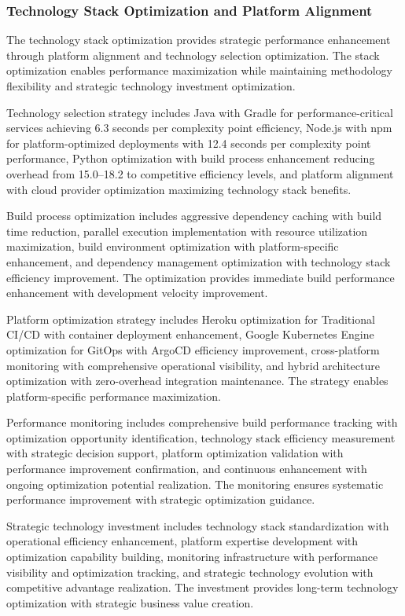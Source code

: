 \subsubsection{Technology Stack Optimization and Platform Alignment}

The technology stack optimization provides strategic performance enhancement through platform alignment and technology selection optimization. The stack optimization enables performance maximization while maintaining methodology flexibility and strategic technology investment optimization.

Technology selection strategy includes Java with Gradle for performance-critical services achieving 6.3 seconds per complexity point efficiency, Node.js with npm for platform-optimized deployments with 12.4 seconds per complexity point performance, Python optimization with build process enhancement reducing overhead from 15.0--18.2 to competitive efficiency levels, and platform alignment with cloud provider optimization maximizing technology stack benefits.

Build process optimization includes aggressive dependency caching with build time reduction, parallel execution implementation with resource utilization maximization, build environment optimization with platform-specific enhancement, and dependency management optimization with technology stack efficiency improvement. The optimization provides immediate build performance enhancement with development velocity improvement.

Platform optimization strategy includes Heroku optimization for Traditional CI/CD with container deployment enhancement, Google Kubernetes Engine optimization for GitOps with ArgoCD efficiency improvement, cross-platform monitoring with comprehensive operational visibility, and hybrid architecture optimization with zero-overhead integration maintenance. The strategy enables platform-specific performance maximization.

Performance monitoring includes comprehensive build performance tracking with optimization opportunity identification, technology stack efficiency measurement with strategic decision support, platform optimization validation with performance improvement confirmation, and continuous enhancement with ongoing optimization potential realization. The monitoring ensures systematic performance improvement with strategic optimization guidance.

Strategic technology investment includes technology stack standardization with operational efficiency enhancement, platform expertise development with optimization capability building, monitoring infrastructure with performance visibility and optimization tracking, and strategic technology evolution with competitive advantage realization. The investment provides long-term technology optimization with strategic business value creation.

